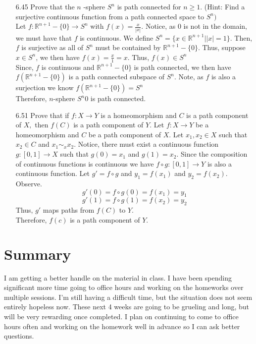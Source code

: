 \documentclass[12pt]{article}
\newcommand{\R}{\mathbb{R}}
\begin{document}
\begin{enumerate}
		\item[6.45] Prove that the $n$ -sphere $S ^ { n }$ is path connected for $n \geq 1 .$ (Hint: Find a surjective continuous function from a path connected space to $S ^ { n })$ \\
		Let $ f: \R^{n+1}-\{0\} \rightarrow S^n$ with $ f(x)=\frac{x}{|x|} $. Notice, as 0 is not in the domain, we must have that $ f $ is continuous. We define $ S^n = \{x\in\R^{n+1}| |x| = 1\} $. Then, $ f $ is surjective as all of $ S^n $ must be contained by $ \R^{n+1} -\{0\}$. Thus, suppose $ x \in S^n $, we then have $ f(x)=\frac{x}{1} = x $. Thus, $ f(x)\in S^n $\\
		Since, $ f $ is continuous and $ \R^{n+1}-\{0\} $ is path connected, we then have $ f(\R^{n+1}-\{0\}) $ is a path connected subspace of $ S^n$. Note, as $ f $ is also a surjection we know $ f(\R^{n+1}-\{0\}) =  S^n $\\
		Therefore, $ n $-sphere $ S^n{0} $ is path connected.
		\item[6.51] Prove that if $f : X \rightarrow Y$ is a homeomorphism and $C$ is a path component of $X ,$ then $f ( C )$ is a path component of $Y .$
			Let $ f:X\rightarrow Y $ be a homeomorphism and $ C $ be a path component of $ X $. Let $x_1,x_2\in X$ such that $ x_2 \in C$ and $ x_1 \sim_x x_2 $. Notice, there must exist a continuous function $ g:[0,1]\rightarrow X $ such that $ g(0)= x_1$ and $ g(1)=x_2 $. Since the composition of continuous functions is continuous we have $ f\circ g:[0,1]\rightarrow Y $ is also a continuous function. Let $g' = f\circ g  $ and $ y_1 = f(x_1) $ and $ y_2=f(x_2) $. Observe.
				\[g'(0)=f\circ g(0)=f(x_1)=y_1\]
				\[g'(1)=f\circ g(1)=f(x_2)=y_2\]
			Thus, $ g' $ maps paths from $ f(C) $ to $ Y $. \\
			Therefore, $ f(c) $ is a path component of $ Y $.
	\end{enumerate}
	\section*{Summary}
	I am getting a better handle on the material in class. I have been spending significant more time going to office hours and working on the homeworks over multiple sessions. I'm still having a difficult time, but the situation does not seem entirely hopeless now. These next 4 weeks are going to be grueling and long, but will be very rewarding once completed. I plan on continuing to come to office hours often and working on the homework well in advance so I can ask better questions.
\end{document}
